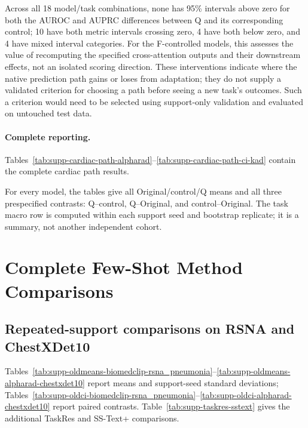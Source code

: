 Across all 18 model/task combinations, none has 95\% intervals above zero for both the AUROC and AUPRC differences between Q and its corresponding control; 10 have both metric intervals crossing zero, 4 have both below zero, and 4 have mixed interval categories. For the F-controlled models, this assesses the value of recomputing the specified cross-attention outputs and their downstream effects, not an isolated scoring direction. These interventions indicate where the native prediction path gains or loses from adaptation; they do not supply a validated criterion for choosing a path before seeing a new task's outcomes. Such a criterion would need to be selected using support-only validation and evaluated on untouched test data.

\paragraph{Complete reporting.}
Tables~\ref{tab:supp-cardiac-path-alpharad}--\ref{tab:supp-cardiac-path-ci-kad} contain the complete cardiac path results.

For every model, the tables give all Original/control/Q means and all three prespecified contrasts: Q--control, Q--Original, and control--Original. The task macro row is computed within each support seed and bootstrap replicate; it is a summary, not another independent cohort.



\clearpage

\section{Complete Few-Shot Method Comparisons}
\label{supp:comparison}
\subsection{Repeated-support comparisons on RSNA and ChestXDet10}
Tables~\ref{tab:supp-oldmeans-biomedclip-rsna_pneumonia}--\ref{tab:supp-oldmeans-alpharad-chestxdet10} report means and support-seed standard deviations; Tables~\ref{tab:supp-oldci-biomedclip-rsna_pneumonia}--\ref{tab:supp-oldci-alpharad-chestxdet10} report paired contrasts. Table~\ref{tab:supp-taskres-sstext} gives the additional TaskRes and SS-Text+ comparisons.

